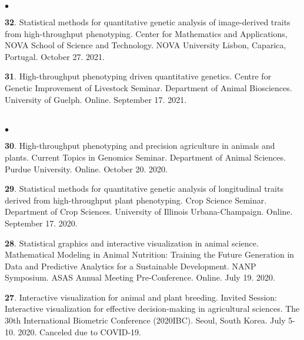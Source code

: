 \documentclass[margin,line,10pt]{res}
\newenvironment{list2}{
  \begin{list}{$\bullet$}{%
      \setlength{\itemsep}{0in}
      \setlength{\parsep}{0in} \setlength{\parskip}{0in}
      \setlength{\topsep}{0in} \setlength{\partopsep}{0in} 
      \setlength{\leftmargin}{0.2in}}}{\end{list}}
\begin{document}
\begin{resume}
\begin{list2}
\item [{\bf 32}.] Statistical methods for quantitative genetic analysis of image-derived traits from high-throughput phenotyping. Center for Mathematics and Applications, NOVA School of Science and Technology. NOVA University Lisbon, Caparica, Portugal. October 27. 2021.

      \vspace{0.5cm}
  
 \item [{\bf 31}.] High-throughput phenotyping driven quantitative genetics. Centre for Genetic Improvement of Livestock Seminar. Department of Animal Biosciences. University of Guelph. Online. September 17. 2021.

\end{list2}

\section{}
\begin{list2}

  \item [{\bf 30}.] High-throughput phenotyping and precision agriculture in animals and plants. Current Topics in Genomics Seminar. Department of Animal Sciences. Purdue University. Online. October 20. 2020.

     \vspace{0.5cm}

 \item [{\bf 29}.] Statistical methods for quantitative genetic analysis of longitudinal traits derived from high-throughput plant phenotyping. Crop Science Seminar. Department of Crop Sciences. University of Illinois Urbana-Champaign. Online. September 17. 2020.

     \vspace{0.5cm}

 \item [{\bf 28}.] Statistical graphics and interactive visualization in animal science. Mathematical Modeling in Animal Nutrition: Training the Future Generation in Data and Predictive Analytics for a Sustainable Development. NANP Symposium. ASAS Annual Meeting Pre-Conference. Online. July 19. 2020.


  \vspace{0.5cm}


\item [{\bf 27}.] Interactive visualization for animal and plant breeding. Invited Session: Interactive visualization for effective decision-making in agricultural sciences. The 30th International Biometric Conference (2020IBC). Seoul, South Korea. July 5-10. 2020. Canceled due to COVID-19. 


\end{list2}
\end{resume}
\end{document}
